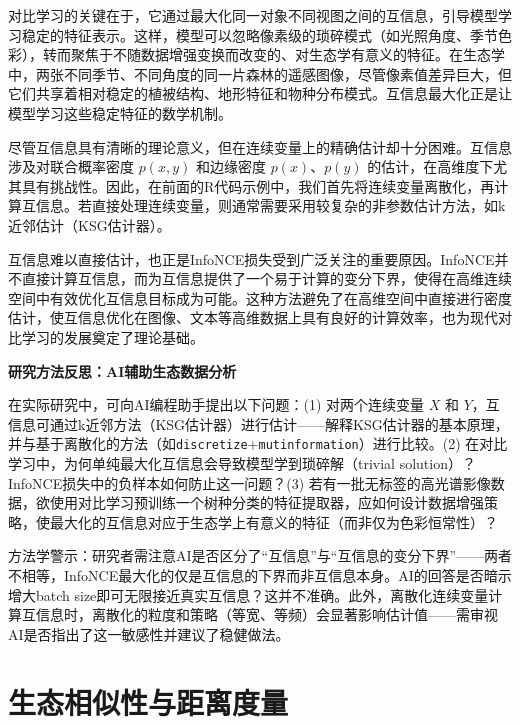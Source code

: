 \documentclass[
  twoside,12pt,fontset=none]{ctexbook}
\renewenvironment{quote}{%
  \def\FrameCommand{{\color{quote-border}\vrule width 4pt}\hspace{10pt}}%
  \MakeFramed {\advance\hsize-\width \FrameRestore\noindent\ignorespaces}%
}{%
  \endMakeFramed
}
\begin{document}
对比学习的关键在于，它通过最大化同一对象不同视图之间的互信息，引导模型学习稳定的特征表示。这样，模型可以忽略像素级的琐碎模式（如光照角度、季节色彩），转而聚焦于不随数据增强变换而改变的、对生态学有意义的特征。在生态学中，两张不同季节、不同角度的同一片森林的遥感图像，尽管像素值差异巨大，但它们共享着相对稳定的植被结构、地形特征和物种分布模式。互信息最大化正是让模型学习这些稳定特征的数学机制。

尽管互信息具有清晰的理论意义，但在连续变量上的精确估计却十分困难。互信息涉及对联合概率密度 \(p(x,y)\) 和边缘密度 \(p(x)\)、\(p(y)\) 的估计，在高维度下尤其具有挑战性。因此，在前面的R代码示例中，我们首先将连续变量离散化，再计算互信息。若直接处理连续变量，则通常需要采用较复杂的非参数估计方法，如k近邻估计（KSG估计器）。

互信息难以直接估计，也正是InfoNCE损失受到广泛关注的重要原因。InfoNCE并不直接计算互信息，而为互信息提供了一个易于计算的变分下界，使得在高维连续空间中有效优化互信息目标成为可能。这种方法避免了在高维空间中直接进行密度估计，使互信息优化在图像、文本等高维数据上具有良好的计算效率，也为现代对比学习的发展奠定了理论基础。

\begin{quote}
\textbf{研究方法反思：AI辅助生态数据分析}

在实际研究中，可向AI编程助手提出以下问题：(1) 对两个连续变量 \(X\) 和 \(Y\)，互信息可通过k近邻方法（KSG估计器）进行估计------解释KSG估计器的基本原理，并与基于离散化的方法（如\texttt{discretize}+\texttt{mutinformation}）进行比较。(2) 在对比学习中，为何单纯最大化互信息会导致模型学到琐碎解（trivial solution）？InfoNCE损失中的负样本如何防止这一问题？(3) 若有一批无标签的高光谱影像数据，欲使用对比学习预训练一个树种分类的特征提取器，应如何设计数据增强策略，使最大化的互信息对应于生态学上有意义的特征（而非仅为色彩恒常性）？

方法学警示：研究者需注意AI是否区分了``互信息''与``互信息的变分下界''------两者不相等，InfoNCE最大化的仅是互信息的下界而非互信息本身。AI的回答是否暗示增大batch size即可无限接近真实互信息？这并不准确。此外，离散化连续变量计算互信息时，离散化的粒度和策略（等宽、等频）会显著影响估计值------需审视AI是否指出了这一敏感性并建议了稳健做法。
\end{quote}

\hypertarget{ux751fux6001ux76f8ux4f3cux6027ux4e0eux8dddux79bbux5ea6ux91cf}{%
\section{生态相似性与距离度量}\label{ux751fux6001ux76f8ux4f3cux6027ux4e0eux8dddux79bbux5ea6ux91cf}}
\end{document}
